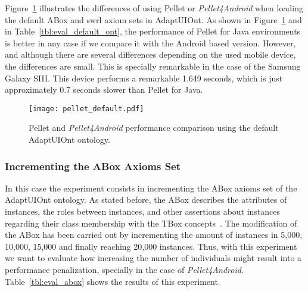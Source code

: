 Figure~\ref{fig:pellet_default} illustrates the differences of using Pellet or
\textit{Pellet4Android} when loading the default ABox and \ac{swrl} axiom sets in 
AdaptUIOnt. As shown in Figure~\ref{fig:pellet_default} and in 
Table~\ref{tbl:eval_default_ont}, the performance of Pellet for Java 
environments is better in any case if we compare it with the Android based 
version. However, and although there are several differences depending on the 
used mobile device, the differences are small. This is specially remarkable in 
the case of the Samsung Galaxy SIII. This device performs a remarkable 1.649 
seconds, which is just approximately 0.7 seconds slower than Pellet for Java.

\begin{figure}
\centering
\texttt{[image: pellet\_default.pdf]}
\caption{Pellet and \textit{Pellet4Android} performance comparison using the
default AdaptUIOnt ontology.}
\label{fig:pellet_default}
\end{figure}

\subsubsection{Incrementing the ABox Axioms Set}
\label{sec:eval_abox}

In this case the experiment consists in incrementing the ABox axioms set of 
the AdaptUIOnt ontology. As stated before, the ABox describes the attributes of 
instances, the roles between instances, and other assertions about instances 
regarding their class membership with the TBox concepts~\citep{abox_tbox}. 
The modification of the ABox has been carried out by incrementing the amount of 
instances in 5,000, 10,000, 15,000 and finally reaching 20,000 instances. Thus, 
with this experiment we want to evaluate how increasing the number of 
individuals might result into a performance penalization, specially in the case 
of \textit{Pellet4Android}. Table~\ref{tbl:eval_abox} shows the results of this
experiment.

